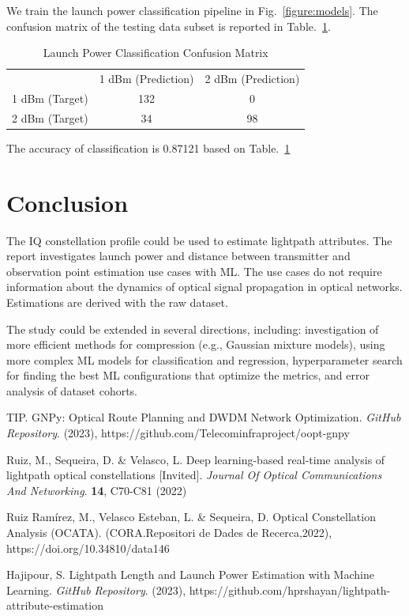 \documentclass[lettersize,journal, one-column]{IEEEtran}
\begin{document}
We train the launch power classification pipeline in Fig.~\ref{figure:models}.
The confusion matrix of the testing data subset is reported in Table.~\ref{table:confusion_mat}.
\begin{table}
    \centering
    \caption{Launch Power Classification Confusion Matrix}
    \begin{tabular}{l l l}
        & 1 dBm (Prediction) & 2 dBm (Prediction) \\
        \cline{2-3}
        1 dBm (Target) & \multicolumn{1}{|c|}{132} & \multicolumn{1}{c|}{0} \\
        \cline{2-3}
        2 dBm (Target) & \multicolumn{1}{|c|}{34} & \multicolumn{1}{c|}{98} \\
        \cline{2-3}
    \end{tabular}
    \label{table:confusion_mat}
\end{table}
The accuracy of classification is 0.87121 based on Table.~\ref{table:confusion_mat}

\section{Conclusion}
\label{section:conclusion}
The IQ constellation profile could be used to estimate lightpath attributes.
The report investigates launch power and distance between transmitter and observation point estimation use cases with ML.
The use cases do not require information about the dynamics of optical signal propagation in optical networks.
Estimations are derived with the raw dataset. 

The study could be extended in several directions, including: investigation of more efficient methods for compression (e.g., Gaussian mixture models), using more complex ML models for classification and regression, hyperparameter search for finding the best ML configurations that optimize the metrics, and error analysis of dataset cohorts.


\begin{thebibliography}{1}


TIP. GNPy: Optical Route Planning and DWDM Network Optimization. {\em GitHub Repository}. (2023), https://github.com/Telecominfraproject/oopt-gnpy

Ruiz, M., Sequeira, D. \& Velasco, L. Deep learning-based real-time analysis of lightpath optical constellations [Invited]. {\em Journal Of Optical Communications And Networking}. \textbf{14}, C70-C81 (2022)

Ruiz Ramírez, M., Velasco Esteban, L. \& Sequeira, D. Optical Constellation Analysis (OCATA). (CORA.Repositori de Dades de Recerca,2022), https://doi.org/10.34810/data146

Hajipour, S. Lightpath Length and Launch Power Estimation with Machine Learning. {\em GitHub Repository}. (2023), https://github.com/hprshayan/lightpath-attribute-estimation




\end{thebibliography}
\end{document}
